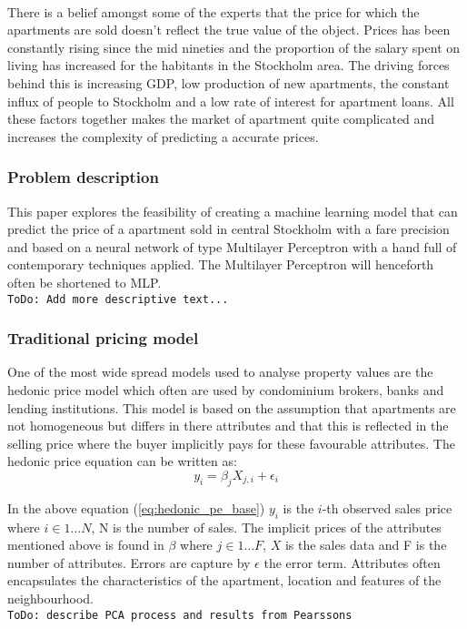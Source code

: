 \\
There is a belief amongst some of the experts that the price for which the apartments are sold doesn't reflect the true value of the object. Prices has been constantly rising since the mid nineties and the proportion of the salary spent on living has increased for the habitants in the Stockholm area. The driving forces behind this is increasing GDP, low production of new apartments, the constant influx of people to Stockholm and a low rate of interest for apartment loans. All these factors together makes the market of apartment quite complicated and increases the complexity of predicting a accurate prices.


\subsubsection{Problem description}
This paper explores the feasibility of creating a machine learning model that can predict the price of a apartment sold in central Stockholm with a fare precision and based on a neural network of type Multilayer Perceptron with a hand full of contemporary techniques applied. The Multilayer Perceptron will henceforth often be shortened to MLP.
\\
\texttt{ToDo: Add more descriptive text...} 
\\

\subsubsection{Traditional pricing model} \label{sss:hedonic}
One of the most wide spread models used to analyse property values are the hedonic price model which often are used by condominium brokers, banks and lending institutions. This model is based on the assumption that apartments are not homogeneous but differs in there attributes and that this is reflected in the selling price where the buyer implicitly pays for these favourable attributes. The hedonic price equation can be written as:
\begin{equation} \label{eq:hedonic_pe_base} 
y_{i} = \beta_{j} X_{j,i}  + \epsilon_{i}
\end{equation}

In the above equation (\ref{eq:hedonic_pe_base}) $y_{i}$ is the $i$-th observed sales price where $i \in 1 \ldots N$, N is the number of sales. The implicit prices of the attributes mentioned above is found in $\beta$ where $j \in 1 \ldots F$, $X$ is the sales data and F is the number of attributes. Errors are capture by $\epsilon$ the error term. Attributes often encapsulates the characteristics of the apartment, location and features of the neighbourhood.  
\\
\texttt{ToDo: describe PCA process and results from Pearssons} 
\\


